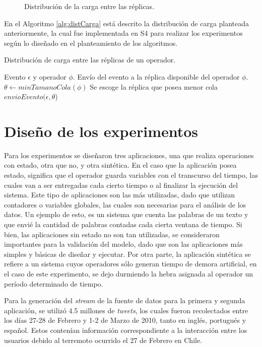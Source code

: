 \begin{figure}[!ht]
	\caption{Distribución de la carga entre las réplicas.}
	\label{fig:distCarga}
\end{figure}

En el Algoritmo \ref{alg:distCarga} está descrito la distribución de carga planteada anteriormente, la cual fue implementada en S4 para realizar los experimentos según lo diseñado en el planteamiento de los algoritmos.

\begin{algorithm}[!ht]
	\caption{Distribución de carga entre las réplicas de un operador.}
	\label{alg:distCarga}
	\begin{algorithmic}[1]
	\REQUIRE Evento $\epsilon$ y operador $\phi$.
	\ENSURE Envío del evento a la réplica disponible del operador $\phi$.
	\STATE $\theta \leftarrow minTamanoCola(\phi)$ \COMMENT Se escoge la réplica que posea menor cola
	\STATE $envioEvento(\epsilon,\theta$)
	\end{algorithmic}
\end{algorithm}

\section{Diseño de los experimentos}
Para los experimentos se diseñaron tres aplicaciones, una que realiza operaciones con estado, otra que no, y otra sintética. En el caso que la aplicación posea estado, significa que el operador guarda variables con el transcurso del tiempo, las cuales van a ser entregadas cada cierto tiempo o al finalizar la ejecución del sistema. Este tipo de aplicaciones son las más utilizadas, dado que utilizan contadores o variables globales, las cuales son necesarias para el análisis de los datos. Un ejemplo de esto, es un sistema que cuenta las palabras de un texto y que envié la cantidad de palabras contadas cada cierta ventana de tiempo. Si bien, las aplicaciones sin estado no son tan utilizadas, se consideraron importantes para la validación del modelo, dado que son las aplicaciones más simples y básicas de diseñar y ejecutar. Por otra parte, la aplicación sintética se refiere a un sistema cuyos operadores sólo generan tiempo de demora artificial, en el caso de este experimento, se dejo durmiendo la hebra asignada al operador un período determinado de tiempo.

Para la generación del \textit{stream} de la fuente de datos para la primera y segunda aplicación, se utilizó 4.5 millones de \textit{tweets}, los cuales fueron recolectados entre los días 27-28 de Febrero y 1-2 de Marzo de 2010, tanto en inglés, portugués y español. Estos contenían información correspondiente a la interacción entre los usuarios debido al terremoto ocurrido el 27 de Febrero en Chile.

